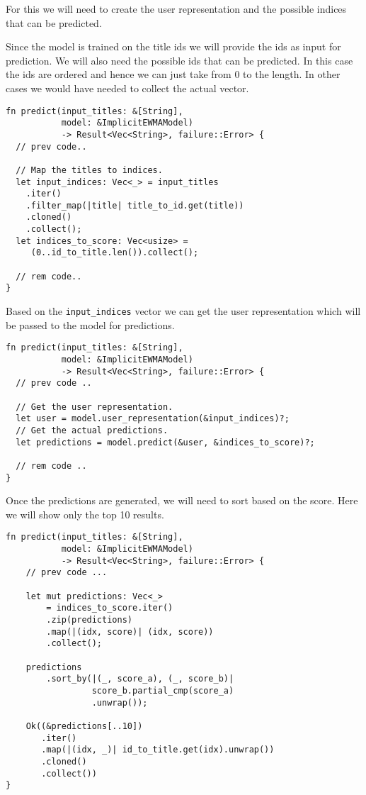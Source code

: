 \documentclass{book}
\begin{document}
For this we will need to create the user representation and the possible indices that can be predicted.

Since the model is trained on the title ids we will provide the ids as input for prediction. We will also need the possible ids that can be predicted. In this case the ids are ordered and hence we can just take from 0 to the length. In other cases we would have needed to collect the actual vector.

\begin{lstlisting}[caption={chapter7/goodbooks-recommender/src/main.rs}, basicstyle=\small]
fn predict(input_titles: &[String],
           model: &ImplicitEWMAModel)
           -> Result<Vec<String>, failure::Error> {
  // prev code..

  // Map the titles to indices.
  let input_indices: Vec<_> = input_titles
    .iter()
    .filter_map(|title| title_to_id.get(title))
    .cloned()
    .collect();
  let indices_to_score: Vec<usize> =
     (0..id_to_title.len()).collect();

  // rem code..
}
\end{lstlisting}

Based on the \lstinline{input_indices} vector we can get the user representation which will be passed to the model for predictions.

\begin{lstlisting}[caption={chapter7/goodbooks-recommender/src/main.rs}, basicstyle=\small]
fn predict(input_titles: &[String],
           model: &ImplicitEWMAModel)
           -> Result<Vec<String>, failure::Error> {
  // prev code ..

  // Get the user representation.
  let user = model.user_representation(&input_indices)?;
  // Get the actual predictions.
  let predictions = model.predict(&user, &indices_to_score)?;

  // rem code ..
}
\end{lstlisting}

Once the predictions are generated, we will need to sort based on the score. Here we will show only the top 10 results.

\begin{lstlisting}[caption={chapter7/goodbooks-recommender/src/main.rs}, basicstyle=\small]
fn predict(input_titles: &[String],
           model: &ImplicitEWMAModel)
           -> Result<Vec<String>, failure::Error> {
    // prev code ...

    let mut predictions: Vec<_>
        = indices_to_score.iter()
        .zip(predictions)
        .map(|(idx, score)| (idx, score))
        .collect();

    predictions
        .sort_by(|(_, score_a), (_, score_b)|
                 score_b.partial_cmp(score_a)
                 .unwrap());

    Ok((&predictions[..10])
       .iter()
       .map(|(idx, _)| id_to_title.get(idx).unwrap())
       .cloned()
       .collect())
}
\end{lstlisting}
\end{document}

